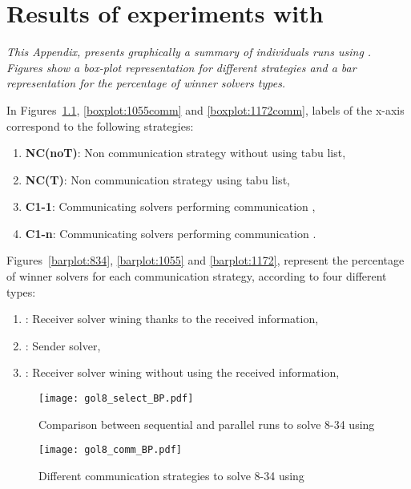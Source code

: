 \chapter{Results of experiments with \grp}
\label{app:grp}
\textit{This Appendix, presents graphically a summary of individuals runs using \grp. Figures show a \textit{box-plot} representation for different strategies and a bar representation for the percentage of winner solvers types.}
\vfill
\newpage

In Figures~\ref{boxplot:834comm}, \ref{boxplot:1055comm} and \ref{boxplot:1172comm}, labels of the x-axis correspond to the following strategies:
\begin{enumerate}[itemsep=-1mm]
\item \textbf{NC(noT)}: Non communication strategy without using tabu list, 
\item \textbf{NC(T)}: Non communication strategy using tabu list,
\item \textbf{C1-1}: Communicating solvers performing communication \oneTone,
\item \textbf{C1-n}: Communicating solvers performing communication \oneTn.
\end{enumerate}

Figures~\ref{barplot:834}, \ref{barplot:1055} and \ref{barplot:1172}, represent the percentage of winner solvers for each communication strategy, according to four different types:
\begin{enumerate}[itemsep=-1mm]
\item {}: Receiver solver wining thanks to the received information, 
\item {}: Sender solver, 
\item {}: Receiver solver wining without using the received information,
\end{enumerate}

\begin{figure}[!h]
\centering
\texttt{[image: gol8\_select\_BP.pdf]}
\caption{Comparison between sequential and parallel runs to solve \GRP{} 8-34 using \posl}
\end{figure}

\begin{figure}[!h]
\centering
\texttt{[image: gol8\_comm\_BP.pdf]}
\caption{Different communication strategies to solve \GRP{} 8-34 using \posl}\label{boxplot:834comm}
\end{figure}

